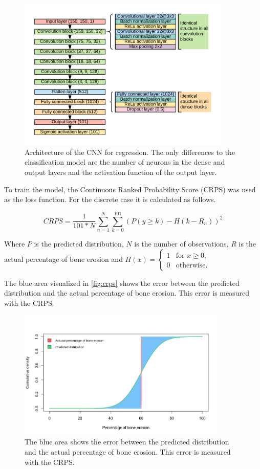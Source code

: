 \documentclass[12pt]{article}
\begin{document}
\begin{figure}[ht]
\includegraphics[width=4in]{cnn_regression}	
\caption{Architecture of the CNN for regression. The only differences to the classification model are the number of neurons in the dense and output layers and the activation function of the output layer.}
\label{fig:cnn_reg}
\end{figure}

To train the model, the Continuous Ranked Probability Score (CRPS) was used as the loss function. For the discrete case it is calculated as follows. \cite{crps}

$$CRPS = \frac{1}{101 * N} \sum\limits_{n=1}^{N} \sum\limits_{k=0}^{101} (P(y \geq k) - H(k - R_n))^2$$

Where $P$ is the predicted distribution, $N$ is the number of observations, $R$ is the actual percentage of bone erosion and $H(x) = \begin{cases}
1 & \text{for $x \geq 0$,}\\
0 & \text{otherwise.}
\end{cases}$ \cite{crps}

The blue area visualized in \autoref{fig:crps} shows the error between the predicted distribution and the actual percentage of bone erosion. This error is measured with the CRPS. \cite{crps}

\begin{figure}[ht]
\includegraphics[width=10cm]{crps}	
\caption{The blue area shows the error between the predicted distribution and the actual percentage of bone erosion. This error is measured with the CRPS.}
\label{fig:crps}
\end{figure}
\end{document}
